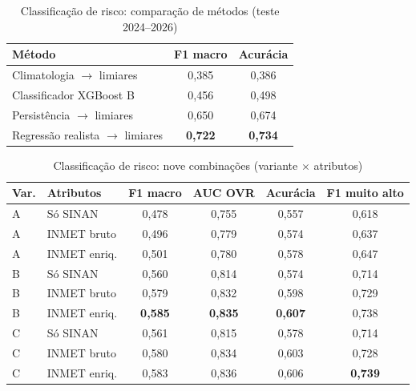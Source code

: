 \begin{table}[htb]
\centering
\caption{Classificação de risco: comparação de métodos (teste 2024--2026)}
\label{tab:cls_baselines}
\small
\begin{tabular}{|l|c|c|}
\hline
\textbf{Método} & \textbf{F1 macro} & \textbf{Acurácia} \\ \hline
Climatologia $\rightarrow$ limiares & 0,385 & 0,386 \\ \hline
Classificador XGBoost B & 0,456 & 0,498 \\ \hline
Persistência $\rightarrow$ limiares & 0,650 & 0,674 \\ \hline
Regressão realista $\rightarrow$ limiares & \textbf{0,722} & \textbf{0,734} \\ \hline
\end{tabular}
\end{table}

\begin{table}[htb]
\centering
\caption{Classificação de risco: nove combinações (variante $\times$ atributos)}
\label{tab:v4_classificacao}
\small
\begin{tabular}{|l|l|c|c|c|c|}
\hline
\textbf{Var.} & \textbf{Atributos} & \textbf{F1 macro} & \textbf{AUC OVR} & \textbf{Acurácia} & \textbf{F1 muito alto} \\ \hline
A & Só SINAN     & 0,478 & 0,755 & 0,557 & 0,618 \\ \hline
A & INMET bruto   & 0,496 & 0,779 & 0,574 & 0,637 \\ \hline
A & INMET enriq.  & 0,501 & 0,780 & 0,578 & 0,647 \\ \hline
B & Só SINAN     & 0,560 & 0,814 & 0,574 & 0,714 \\ \hline
B & INMET bruto   & 0,579 & 0,832 & 0,598 & 0,729 \\ \hline
B & INMET enriq.  & \textbf{0,585} & \textbf{0,835} & \textbf{0,607} & 0,738 \\ \hline
C & Só SINAN     & 0,561 & 0,815 & 0,578 & 0,714 \\ \hline
C & INMET bruto   & 0,580 & 0,834 & 0,603 & 0,728 \\ \hline
C & INMET enriq.  & 0,583 & 0,836 & 0,606 & \textbf{0,739} \\ \hline
\end{tabular}
\end{table}

